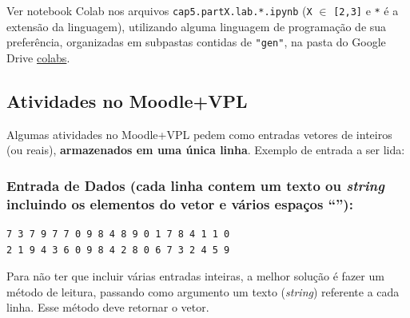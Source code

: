 \documentclass[12pt,a4paper]{article}
\begin{document}
    Ver notebook Colab nos arquivos \texttt{cap5.partX.lab.*.ipynb}
(\texttt{X} \(\in\) \texttt{{[}2,3{]}} e \texttt{*} é a extensão da
linguagem), utilizando alguma linguagem de programação de sua
preferência, organizadas em subpastas contidas de \texttt{"gen"}, na
pasta do Google Drive
\href{https://drive.google.com/drive/folders/1YlFwv8XYN7PYYf-HwDMlkxzbmXzJw9cM?usp=sharing}{colabs}.

    \hypertarget{atividades-no-moodlevpl}{%
\subsection{Atividades no Moodle+VPL}\label{atividades-no-moodlevpl}}

Algumas atividades no Moodle+VPL pedem como entradas vetores de inteiros
(ou reais), \textbf{armazenados em uma única linha}. Exemplo de entrada
a ser lida:

\hypertarget{entrada-de-dados-cada-linha-contem-um-texto-ou-string-incluindo-os-elementos-do-vetor-e-vuxe1rios-espauxe7os}{%
\subsubsection{\texorpdfstring{Entrada de Dados (cada linha contem um
texto ou \emph{string} incluindo os elementos do vetor e vários espaços
``\texttt{}''):}{Entrada de Dados (cada linha contem um texto ou string incluindo os elementos do vetor e vários espaços ``\,''):}}\label{entrada-de-dados-cada-linha-contem-um-texto-ou-string-incluindo-os-elementos-do-vetor-e-vuxe1rios-espauxe7os}}

\begin{verbatim}
7 3 7 9 7 7 0 9 8 4 8 9 0 1 7 8 4 1 1 0 
2 1 9 4 3 6 0 9 8 4 2 8 0 6 7 3 2 4 5 9
\end{verbatim}

Para não ter que incluir várias entradas inteiras, a melhor solução é
fazer um método de leitura, passando como argumento um texto
(\emph{string}) referente a cada linha. Esse método deve retornar o
vetor.
\end{document}
